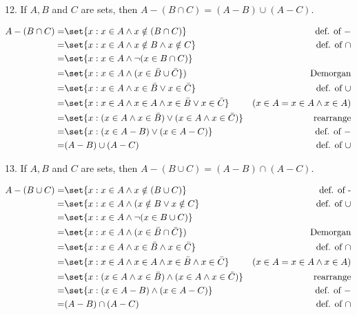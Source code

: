 \documentclass{hippoidC}
\begin{document}
\begin{prooflist}{12. If $A, B$ and $C$ are sets, then $A-(B \cap C)=(A-B) \cup(A-C)$.}
\item
\begin{align*}
    A-(B \cap C)=& \set{x: x\in A \land x\notin(B \cap C)} & \text{def. of }-\\
    =& \set{x: x\in A \land x\notin B \land x\notin C} & \text{def. of $\cap$}\\
    =& \set{x: x\in A \land \neg{(x\in B \cap C})} & \\
    =& \set{x: x\in A \land (x\in \bar{B} \cup \bar{C}}) & \text{Demorgan}\\
    =& \set{x: x\in A \land x\in \bar{B} \lor x\in\bar{C}} & \text{def. of }\cup\\
    =& \set{x: x\in A \land x\in A \land x\in \bar{B} \lor x\in\bar{C}} & (x\in A = x\in A \land x \in A) \\
    =& \set{x: (x\in A \land x\in \bar{B}) \lor (x\in A \land x\in\bar{C})} & \text{rearrange}\\
    =& \set{x: (x\in A  - B) \lor (x\in A - C)} & \text{def. of }-\\
    =& (A - B) \cup (A-C) & \text{def. of }\cup\\
\end{align*}
\end{prooflist}


\begin{prooflist}{13. If $A, B$ and $C$ are sets, then $A-(B \cup C)=(A-B) \cap(A-C)$.}
\item
\begin{align*}
    A-(B \cup C)=& \set{x: x\in A \land x\notin(B \cup C)} & \text{def. of -}\\
    =& \set{x: x\in A \land (x\notin B \lor x\notin C} & \text{def. of $\cup$}\\
    =& \set{x: x\in A \land \neg{(x\in B \cup C})} & \\
    =& \set{x: x\in A \land (x\in \bar{B} \cap \bar{C}}) & \text{Demorgan}\\
    =& \set{x: x\in A \land x\in \bar{B} \land x\in\bar{C}} & \text{def. of }\cap\\
    =& \set{x: x\in A \land x\in A \land x\in \bar{B} \land x\in\bar{C}} & (x\in A = x\in A \land x \in A) \\
    =& \set{x: (x\in A \land x\in \bar{B}) \land (x\in A \land x\in\bar{C})} & \text{rearrange}\\
    =& \set{x: (x\in A  - B) \land (x\in A - C)} & \text{def. of }-\\
    =& (A - B) \cap (A-C) & \text{def. of }\cap
\end{align*}
\end{prooflist}
\end{document}
